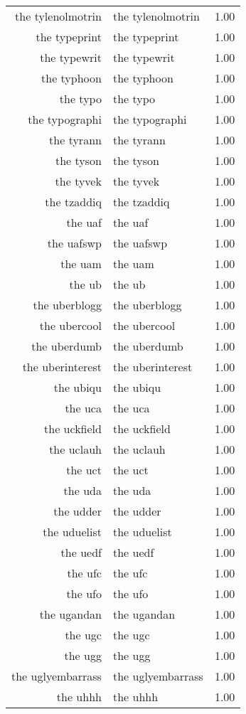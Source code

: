 \begin{table}[ht]
\begin{tabular}{rlr}
  the tylenolmotrin & the tylenolmotrin & 1.00 \\ 
  the typeprint & the typeprint & 1.00 \\ 
  the typewrit & the typewrit & 1.00 \\ 
  the typhoon & the typhoon & 1.00 \\ 
  the typo & the typo & 1.00 \\ 
  the typographi & the typographi & 1.00 \\ 
  the tyrann & the tyrann & 1.00 \\ 
  the tyson & the tyson & 1.00 \\ 
  the tyvek & the tyvek & 1.00 \\ 
  the tzaddiq & the tzaddiq & 1.00 \\ 
  the uaf & the uaf & 1.00 \\ 
  the uafswp & the uafswp & 1.00 \\ 
  the uam & the uam & 1.00 \\ 
  the ub & the ub & 1.00 \\ 
  the uberblogg & the uberblogg & 1.00 \\ 
  the ubercool & the ubercool & 1.00 \\ 
  the uberdumb & the uberdumb & 1.00 \\ 
  the uberinterest & the uberinterest & 1.00 \\ 
  the ubiqu & the ubiqu & 1.00 \\ 
  the uca & the uca & 1.00 \\ 
  the uckfield & the uckfield & 1.00 \\ 
  the uclauh & the uclauh & 1.00 \\ 
  the uct & the uct & 1.00 \\ 
  the uda & the uda & 1.00 \\ 
  the udder & the udder & 1.00 \\ 
  the uduelist & the uduelist & 1.00 \\ 
  the uedf & the uedf & 1.00 \\ 
  the ufc & the ufc & 1.00 \\ 
  the ufo & the ufo & 1.00 \\ 
  the ugandan & the ugandan & 1.00 \\ 
  the ugc & the ugc & 1.00 \\ 
  the ugg & the ugg & 1.00 \\ 
  the uglyembarrass & the uglyembarrass & 1.00 \\ 
  the uhhh & the uhhh & 1.00 \\ 

\end{tabular}
\end{table}
